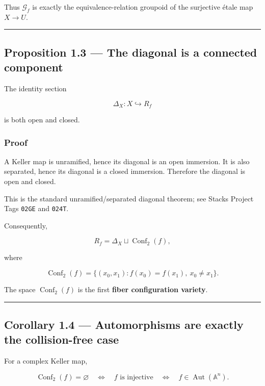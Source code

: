 Thus \(\mathcal G_f\) is exactly the equivalence-relation groupoid of
the surjective étale map \(X\to U\).

\begin{center}\rule{0.5\linewidth}{0.5pt}\end{center}

\subsection{Proposition 1.3 --- The diagonal is a connected
component}\label{proposition-1.3-the-diagonal-is-a-connected-component}

The identity section

\[
\Delta_X\colon X\hookrightarrow R_f
\]

is both open and closed.

\subsubsection{Proof}\label{proof}

A Keller map is unramified, hence its diagonal is an open immersion. It
is also separated, hence its diagonal is a closed immersion. Therefore
the diagonal is open and closed.

This is the standard unramified/separated diagonal theorem; see Stacks
Project Tags \texttt{02GE} and \texttt{024T}.

Consequently,

\[
R_f=\Delta_X\sqcup \operatorname{Conf}_2(f),
\]

where

\[
\operatorname{Conf}_2(f)=\{(x_0,x_1):f(x_0)=f(x_1),\ x_0\ne x_1\}.
\]

The space \(\operatorname{Conf}_2(f)\) is the first \textbf{fiber
configuration variety}.

\begin{center}\rule{0.5\linewidth}{0.5pt}\end{center}

\subsection{Corollary 1.4 --- Automorphisms are exactly the
collision-free
case}\label{corollary-1.4-automorphisms-are-exactly-the-collision-free-case}

For a complex Keller map,

\[
\operatorname{Conf}_2(f)=\varnothing
\quad\Longleftrightarrow\quad
f\text{ is injective}
\quad\Longleftrightarrow\quad
f\in\operatorname{Aut}(\mathbb A^n).
\]

